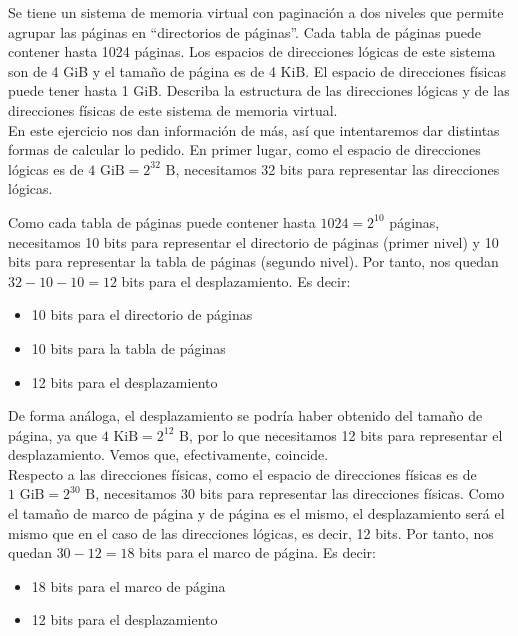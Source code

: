 \begin{ejercicio}
    Se tiene un sistema de memoria virtual con paginación a dos niveles que permite
agrupar las páginas en ``directorios de páginas''. Cada tabla de páginas puede contener
hasta 1024 páginas. Los espacios de direcciones lógicas de este sistema son de
4 GiB y el tamaño de página es de 4 KiB. El espacio de direcciones físicas puede
tener hasta 1 GiB. Describa la estructura de las direcciones lógicas y de las direcciones
físicas de este sistema de memoria virtual.\\

    En este ejercicio nos dan información de más, así que intentaremos dar distintas formas
    de calcular lo pedido. En primer lugar, como el espacio de direcciones lógicas es de
    $4 \text{ GiB}=2^{32} \text{ B}$, necesitamos 32 bits para representar las direcciones lógicas.

    Como cada tabla de páginas puede contener hasta $1024=2^{10}$ páginas, necesitamos 10 bits para
    representar el directorio de páginas (primer nivel) y 10 bits para representar la tabla de páginas (segundo nivel).
    Por tanto, nos quedan $32-10-10=12$ bits para el desplazamiento. Es decir:
    \begin{itemize}
        \item {10 bits para el directorio de páginas}
        \item {10 bits para la tabla de páginas}
        \item {12 bits para el desplazamiento}
    \end{itemize}

    De forma análoga, el desplazamiento se podría haber obtenido del tamaño de página,
    ya que $4 \text{ KiB}=2^{12} \text{ B}$, por lo que necesitamos 12 bits para representar el desplazamiento.
    Vemos que, efectivamente, coincide.\\

    Respecto a las direcciones físicas, como el espacio de direcciones físicas es de
    $1 \text{ GiB}=2^{30} \text{ B}$, necesitamos 30 bits para representar las direcciones físicas.
    Como el tamaño de marco de página y de página es el mismo, el desplazamiento
    será el mismo que en el caso de las direcciones lógicas, es decir, 12 bits.
    Por tanto, nos quedan $30-12=18$ bits para el marco de página. Es decir:
    \begin{itemize}
        \item {18 bits para el marco de página}
        \item {12 bits para el desplazamiento}
    \end{itemize}
\end{ejercicio}


